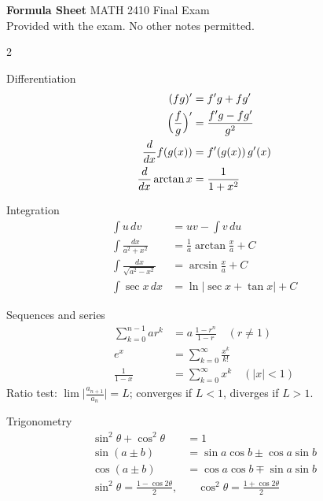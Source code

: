 \documentclass[10pt]{article}
\begin{document}
\begin{center}
  {\Large\bfseries\color{accent} Formula Sheet}\quad
  {\large MATH 2410 Final Exam}\\[2pt]
  \small Provided with the exam. No other notes permitted.
\end{center}

\begin{multicols}{2}
\small

\begin{fgroup}{Differentiation}
\begin{align*}
  (fg)' &= f'g + fg' \\
  \Bigl(\frac{f}{g}\Bigr)' &= \frac{f'g - fg'}{g^2} \\
  \frac{d}{dx} f(g(x)) &= f'(g(x))\,g'(x) \\
  \frac{d}{dx}\arctan x &= \frac{1}{1 + x^2}
\end{align*}
\end{fgroup}

\begin{fgroup}{Integration}
\begin{align*}
  \int u \, dv &= uv - \int v \, du \\
  \int \frac{dx}{a^2 + x^2} &= \frac{1}{a}\arctan\frac{x}{a} + C \\
  \int \frac{dx}{\sqrt{a^2 - x^2}} &= \arcsin\frac{x}{a} + C \\
  \int \sec x \, dx &= \ln\lvert \sec x + \tan x \rvert + C
\end{align*}
\end{fgroup}

\begin{fgroup}{Sequences and series}
\begin{align*}
  \sum_{k=0}^{n-1} ar^k &= a\,\frac{1 - r^n}{1 - r} \quad (r \neq 1) \\
  e^{x} &= \sum_{k=0}^{\infty} \frac{x^k}{k!} \\
  \frac{1}{1 - x} &= \sum_{k=0}^{\infty} x^k \quad (\lvert x \rvert < 1)
\end{align*}
Ratio test: $\lim \bigl|\tfrac{a_{n+1}}{a_n}\bigr| = L$; converges if
$L < 1$, diverges if $L > 1$.
\end{fgroup}

\begin{fgroup}{Trigonometry}
\begin{align*}
  \sin^2\theta + \cos^2\theta &= 1 \\
  \sin(a \pm b) &= \sin a \cos b \pm \cos a \sin b \\
  \cos(a \pm b) &= \cos a \cos b \mp \sin a \sin b \\
  \sin^2\theta = \tfrac{1 - \cos 2\theta}{2}, &\quad
  \cos^2\theta = \tfrac{1 + \cos 2\theta}{2}
\end{align*}
\end{fgroup}


\end{multicols}
\end{document}

